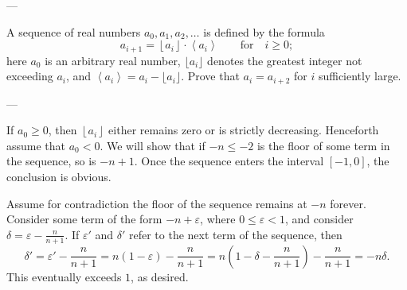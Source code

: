 
---

A sequence of real numbers $a_{0},a_{1},a_{2},\ldots$ is defined by the formula \[a_{i+1}=\left\lfloor a_i\right\rfloor\cdot\left\langle a_{i}\right\rangle\qquad\text{for}\quad i\ge0;\]
here $a_0$ is an arbitrary real number, $\lfloor a_i\rfloor$ denotes the greatest integer not exceeding $a_i$, and $\left\langle a_i\right\rangle=a_i-\lfloor a_i\rfloor$. Prove that $a_i=a_{i+2}$ for $i$ sufficiently large.

---

If $a_0\ge0$, then $\left\lfloor a_i\right\rfloor$ either remains zero or is strictly decreasing. Henceforth assume that $a_0<0$. We will show that if $-n\le-2$ is the floor of some term in the sequence, so is $-n+1$. Once the sequence enters the interval $[-1,0]$, the conclusion is obvious.

Assume for contradiction the floor of the sequence remains at $-n$ forever. Consider some term of the form $-n+\varepsilon$, where $0\le\varepsilon<1$, and consider $\delta=\varepsilon-\frac n{n+1}$. If $\varepsilon'$ and $\delta'$ refer to the next term of the sequence, then \[\delta'=\varepsilon'-\frac n{n+1}=n(1-\varepsilon)-\frac n{n+1}=n\left(1-\delta-\frac n{n+1}\right)-\frac n{n+1}=-n\delta.\]
This eventually exceeds $1$, as desired.
